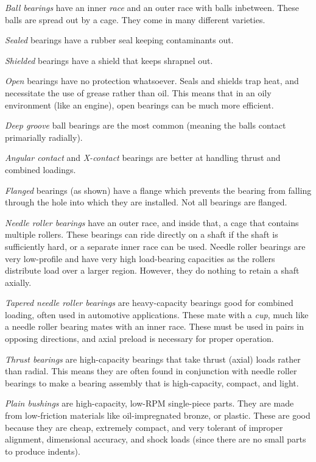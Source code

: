 \documentclass[10pt,letterpaper]{book}
\begin{document}
	\begin{asparaenum}[a)]
		\item \textit{Ball bearings} have an inner \textit{race} and an outer race with balls inbetween. These balls are spread out by a cage. They come in many different varieties.
		\begin{asparaitem}[\ \ \ ]
			\item \textit{Sealed} bearings have a rubber seal keeping contaminants out.
			\item \textit{Shielded} bearings have a shield that keeps shrapnel out.
			\item \textit{Open} bearings have no protection whatsoever. Seals and shields trap heat, and necessitate the use of grease rather than oil. This means that in an oily environment (like an engine), open bearings can be much more efficient.
			
			\item \textit{Deep groove} ball bearings are the most common (meaning the balls contact primarially radially).
			\item \textit{Angular contact} and \textit{X-contact} bearings are better at handling thrust and combined loadings.
			
			\item \textit{Flanged} bearings (as shown) have a flange which prevents the bearing from falling through the hole into which they are installed. Not all bearings are flanged.
		\end{asparaitem}
		\item \textit{Needle roller bearings} have an outer race, and inside that, a cage that contains multiple rollers. These bearings can ride directly on a shaft if the shaft is sufficiently hard, or a separate inner race can be used. Needle roller bearings are very low-profile and have very high load-bearing capacities as the rollers distribute load over a larger region. However, they do nothing to retain a shaft axially.
		\item \textit{Tapered needle roller bearings} are heavy-capacity bearings good for combined loading, often used in automotive applications. These mate with a \textit{cup}, much like a needle roller bearing mates with an inner race. These must be used in pairs in opposing directions, and axial preload is necessary for proper operation.
		\item \textit{Thrust bearings} are high-capacity bearings that take thrust (axial) loads rather than radial. This means they are often found in conjunction with needle roller bearings to make a bearing assembly that is high-capacity, compact, and light.
		\item \textit{Plain bushings} are high-capacity, low-RPM single-piece parts. They are made from low-friction materials like oil-impregnated bronze, or plastic. These are good because they are cheap, extremely compact, and very tolerant of improper alignment, dimensional accuracy, and shock loads (since there are no small parts to produce indents).
	\end{asparaenum}
	
\end{document}
